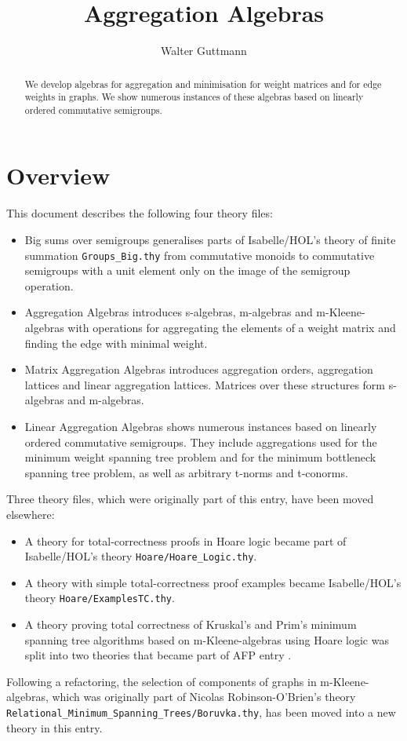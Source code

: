 \documentclass[11pt,a4paper]{article}
\begin{document}
\title{Aggregation Algebras}
\author{Walter Guttmann}
\maketitle

\begin{abstract}
  We develop algebras for aggregation and minimisation for weight matrices and for edge weights in graphs.
  We show numerous instances of these algebras based on linearly ordered commutative semigroups.
\end{abstract}

\tableofcontents

\section{Overview}

This document describes the following four theory files:
\begin{itemize}
\item Big sums over semigroups generalises parts of Isabelle/HOL's theory of finite summation \texttt{Groups\_Big.thy} from commutative monoids to commutative semigroups with a unit element only on the image of the semigroup operation.
\item Aggregation Algebras introduces s-algebras, m-algebras and m-Kleene-algebras with operations for aggregating the elements of a weight matrix and finding the edge with minimal weight.
\item Matrix Aggregation Algebras introduces aggregation orders, aggregation lattices and linear aggregation lattices.
      Matrices over these structures form s-algebras and m-algebras.
\item Linear Aggregation Algebras shows numerous instances based on linearly ordered commutative semigroups.
      They include aggregations used for the minimum weight spanning tree problem and for the minimum bottleneck spanning tree problem, as well as arbitrary t-norms and t-conorms.
\end{itemize}
Three theory files, which were originally part of this entry, have been moved elsewhere:
\begin{itemize}
\item A theory for total-correctness proofs in Hoare logic became part of Isabelle/HOL's theory \texttt{Hoare/Hoare\_Logic.thy}.
\item A theory with simple total-correctness proof examples became Isabelle/HOL's theory \texttt{Hoare/ExamplesTC.thy}.
\item A theory proving total correctness of Kruskal's and Prim's minimum spanning tree algorithms based on m-Kleene-algebras using Hoare logic was split into two theories that became part of AFP entry \cite{GuttmannRobinsonOBrien2020}.
\end{itemize}
Following a refactoring, the selection of components of graphs in m-Kleene-algebras, which was originally part of Nicolas Robinson-O'Brien's theory \texttt{Relational\_Minimum\_Spanning\_Trees/Boruvka.thy}, has been moved into a new theory in this entry.
\end{document}
